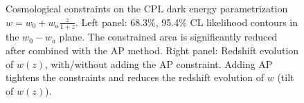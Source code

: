 \documentclass[iop]{emulateapj}
\begin{document}
\begin{figure}
   \caption{\label{fig_con}
   Cosmological constraints on the CPL dark energy parametrization $w=w_0+w_a\frac{z}{1+z}$.
   Left panel: 68.3\%, 95.4\% CL likelihood contours in the  $w_0-w_a$ plane.
   The constrained area is significantly reduced after combined with the AP method.
   Right panel: Redshift evolution of $w(z)$, with/without adding the AP constraint.
   Adding AP tightens the constraints and reduces the redshift evolution of $w$ (tilt of $w(z)$).
   }
\end{figure}


\end{document}
